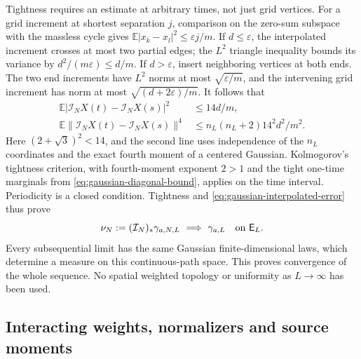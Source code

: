 \documentclass[11pt]{article}
\numberwithin{equation}{section}
\theoremstyle{definition}
\newcommand{\E}{\mathbb E}
\newcommand{\eps}{\varepsilon}
\begin{document}
Tightness requires an estimate at arbitrary times, not just grid vertices.
For a grid increment at shortest separation $j$, comparison on the
zero-sum subspace with the massless cycle gives
$\E|x_k-x_l|^2\leq\eps j/m$.
If $d\leq\eps$, the interpolated increment crosses at most two partial
edges; the $L^2$ triangle inequality bounds its variance by
$d^2/(m\eps)\leq d/m$. If $d>\eps$, insert neighboring vertices at
both ends. The two end increments have $L^2$ norms at most
$\sqrt{\eps/m}$, and the intervening grid increment has norm at most
$\sqrt{(d+2\eps)/m}$. It follows that
\begin{align}
 \E|\mathcal I_NX(t)-\mathcal I_NX(s)|^2&\leq14d/m,\nonumber\\
 \E\|\mathcal I_NX(t)-\mathcal I_NX(s)\|^4
 &\leq n_L(n_L+2)14^2d^2/m^2.
 \label{eq:gaussian-tightness}
\end{align}
Here $(2+\sqrt3)^2<14$, and the second line uses independence of the
$n_L$ coordinates and the exact fourth moment of a centered Gaussian.
Kolmogorov's tightness criterion, with fourth-moment exponent $2>1$ and
the tight one-time marginals from \eqref{eq:gaussian-diagonal-bound},
applies on the time interval. Periodicity is a closed condition. Tightness
and \eqref{eq:gaussian-interpolated-error} thus prove
\begin{equation}
 \nu_N:=(\mathcal I_N)_*\gamma_{a,N,L}
       \ \Longrightarrow\ \gamma_{a,L}\quad\hbox{on }\mathsf E_L.
 \label{eq:gaussian-weak-limit}
\end{equation}
Every subsequential limit has the same Gaussian finite-dimensional laws,
which determine a measure on this continuous-path space.  This proves
convergence of the whole sequence.  No spatial weighted topology or
uniformity as $L\to\infty$ has been used.

\subsection{Interacting weights, normalizers and source moments}
\label{sec:weighted-loop}
\end{document}
